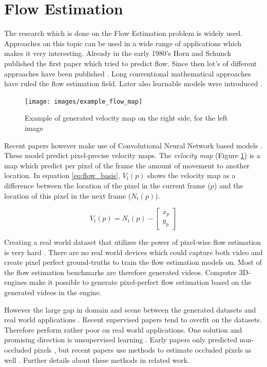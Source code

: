 \section{Flow Estimation}
The research which is done on the Flow Estimation problem is widely used. Approaches on this topic can be used in a wide range of applications which makes it very interesting. Already in the early 1980's Horn and Schunck \cite{Horn1981} published the first paper which tried to predict flow. Since then lot's of different approaches have been published \cite{Memin1998, Bruhn2005, Brox2014}. Long conventional mathematical approaches have ruled the flow estimation field. Later also learnable models were introduced \cite{Pock2008, Wedel2009}.

\begin{figure}[h]
\centering
\texttt{[image: images/example\_flow\_map]}
\caption{Example of generated velocity map on the right side, for the left image}
\label{fig:flow_map}
\end{figure}


Recent papers however make use of Convolutional Neural Network based models \cite{Dosovitskiy2015, ilg_flownet_2016, sun_pwc-net_2018, Ranjan2017, Hui2018}. These model predict pixel-precise velocity maps. The \emph{velocity map} (Figure \ref{fig:flow_map}) is a map which predict per pixel of the frame the amount of movement to another location. In equation \ref{eq:flow_basis}, $V_t(p)$ shows the velocity map as a difference between the location of the pixel in the current frame ($p$) and the location of this pixel in the next frame ($N_t(p)$).

\begin{equation}
\label{eq:flow_basis}
V_t(p) = N_t(p) - \begin{bmatrix} x_{p} \\ y_{p} \end{bmatrix}
\end{equation}

Creating a real world dataset that utilizes the power of pixel-wise flow estimation is very hard \cite{Dosovitskiy2015}. There are no real world devices which could capture both video and create pixel perfect ground-truths to train the flow estimation models on. Most of the flow estimation benchmarks are therefore generated videos. Computer 3D-engines make it possible to generate pixel-perfect flow estimation based on the generated videos in the engine.

However the large gap in domain and scene between the generated datasets and real world applications \cite{Liu2008}. Recent supervised papers \cite{Dosovitskiy2015, sun_pwc-net_2018} tend to overfit on the datasets. Therefore perform rather poor on real world applications. One solution and promising direction is unsupervised learning \cite{Yu2016, Janai2018, liu_ddflow_2019, liu_selflow_2019}. Early papers only predicted non-occluded pixels \cite{Yu2016, Janai2018}, but recent papers use methods to estimate occluded pixels as well \cite{liu_ddflow_2019, liu_selflow_2019}. Further details about these methods in related work.



